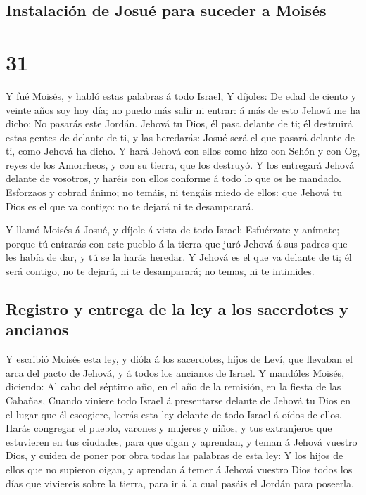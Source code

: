 \hypertarget{instalaciuxf3n-de-josuuxe9-para-suceder-a-moisuxe9s}{%
\subsection{Instalación de Josué para suceder a
Moisés}\label{instalaciuxf3n-de-josuuxe9-para-suceder-a-moisuxe9s}}

\hypertarget{section-05-31}{%
\section{31}\label{section-05-31}}

 Y fué Moisés, y habló estas palabras á todo Israel,
 Y díjoles: De edad de ciento y veinte años soy hoy día;
no puedo más salir ni entrar: á más de esto Jehová me ha dicho: No
pasarás este Jordán.  Jehová tu Dios, él pasa delante de
ti; él destruirá estas gentes de delante de ti, y las heredarás: Josué
será el que pasará delante de ti, como Jehová ha dicho.  Y
hará Jehová con ellos como hizo con Sehón y con Og, reyes de los
Amorrheos, y con su tierra, que los destruyó.  Y los
entregará Jehová delante de vosotros, y haréis con ellos conforme á todo
lo que os he mandado.  Esforzaos y cobrad ánimo; no
temáis, ni tengáis miedo de ellos: que Jehová tu Dios es el que va
contigo: no te dejará ni te desamparará.

 Y llamó Moisés á Josué, y díjole á vista de todo Israel:
Esfuérzate y anímate; porque tú entrarás con este pueblo á la tierra que
juró Jehová á sus padres que les había de dar, y tú se la harás heredar.
 Y Jehová es el que va delante de ti; él será contigo, no
te dejará, ni te desamparará; no temas, ni te intimides.

\hypertarget{registro-y-entrega-de-la-ley-a-los-sacerdotes-y-ancianos}{%
\subsection{Registro y entrega de la ley a los sacerdotes y
ancianos}\label{registro-y-entrega-de-la-ley-a-los-sacerdotes-y-ancianos}}

 Y escribió Moisés esta ley, y dióla á los sacerdotes,
hijos de Leví, que llevaban el arca del pacto de Jehová, y á todos los
ancianos de Israel.  Y mandóles Moisés, diciendo: Al cabo
del séptimo año, en el año de la remisión, en la fiesta de las Cabañas,
 Cuando viniere todo Israel á presentarse delante de
Jehová tu Dios en el lugar que él escogiere, leerás esta ley delante de
todo Israel á oídos de ellos.  Harás congregar el pueblo,
varones y mujeres y niños, y tus extranjeros que estuvieren en tus
ciudades, para que oigan y aprendan, y teman á Jehová vuestro Dios, y
cuiden de poner por obra todas las palabras de esta ley: 
Y los hijos de ellos que no supieron oigan, y aprendan á temer á Jehová
vuestro Dios todos los días que viviereis sobre la tierra, para ir á la
cual pasáis el Jordán para poseerla.

